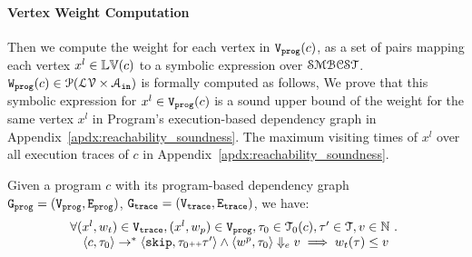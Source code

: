 \paragraph{Vertex Weight Computation}
Then we compute the weight for each vertex in $\mathtt{{V_{prog}}}(c)$,
as a set of pairs 
mapping each vertex $x^l \in \mathbb{LV}(c)$ to a symbolic expression over $\mathcal{SMBCST}$.
$\mathtt{{W_{prog}}}(c) \in \mathcal{P}(\mathcal{LV} \times \mathcal{A}_{\mathtt{in}})$ is formally computed
as follows,
\highlight{
 \[\progV(c) \triangleq
   \left\{ (x^l, w) 
\mid
x^l \in \progV^0(c) \land w = RB(l)
\right\}.
\]
}
%
We prove that this 
symbolic expression for $x^l \in \mathtt{{V_{prog}}}(c)$ is a sound upper bound of 
the weight for the same vertex $x^l$ in Program's execution-based dependency graph in Appendix~\ref{apdx:reachability_soundness}.
The maximum visiting times of $x^l$ over all execution traces of $c$ in Appendix~\ref{apdx:reachability_soundness}. 
%
\begin{thm}
  \label{thm:pathsensitiverb_soundness}
Given a program ${c}$ with its program-based dependency graph 
$\mathtt{{G_{prog}}} = (\mathtt{{V_{prog}}}, \mathtt{{E_{prog}}})$,
$\mathtt{{G_{trace}}} = (\mathtt{{V_{trace}}}, \mathtt{{E_{trace}}})$, we have:
%
\[
  \begin{array}{l}
  \forall (x^l, w_{t}) \in \mathtt{{V_{trace}}},
  (x^l, w_{p}) \in \mathtt{{V_{prog}}}, 
  \mathtt{\tau}_0 \in \mathcal{T}_0(c), 
  \mathtt{\tau}' \in \mathcal{T}, v \in \mathbb{N} ~.~
  \\ \quad
  \langle {c}, \mathtt{\tau}_0 \rangle \to^{*} \langle \mathtt{skip}, \mathtt{\tau}_0{\scriptscriptstyle ++}\mathtt{\tau}' \rangle 
  \land 
  \langle w^{p}, \mathtt{\tau}_0 \rangle \Downarrow_e v
  \implies
  w_{t}(\mathtt{\tau}) \leq v
  \end{array}
\]
\end{thm}
